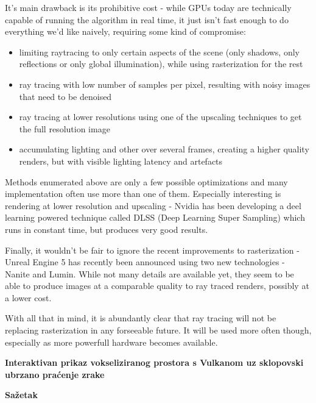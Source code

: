 \documentclass[times, utf8, zavrsni]{fer}
\begin{document}
It's main drawback is its prohibitive cost - while GPUs today are technically capable of running the algorithm in real time, it just isn't fast enough to do everything we'd like naively, requiring some kind of compromise:
\begin{itemize}
	\item limiting raytracing to only certain aspects of the scene (only shadows, only reflections or only global illumination), while using rasterization for the rest
	\item ray tracing with low number of samples per pixel, resulting with noisy images that need to be denoised
	\item ray tracing at lower resolutions using one of the upscaling techniques to get the full resolution image
	\item accumulating lighting and other over several frames, creating a higher quality renders, but with visible lighting latency and artefacts
\end{itemize}

Methods enumerated above are only a few possible optimizations and many implementation often use more than one of them. Especially interesting is rendering at lower resolution and upscaling - Nvidia has been developing a deel learning powered technique called DLSS (Deep Learning Super Sampling) which runs in constant time, but produces very good results.

Finally, it wouldn't be fair to ignore the recent improvements to rasterization - Unreal Engine 5 has recently been announced using two new technologies - Nanite and Lumin. While not many details are available yet, they seem to be able to produce images at a comparable quality to ray traced renders, possibly at a lower cost.

With all that in mind, it is abundantly clear that ray tracing will not be replacing rasterization in any forseeable future. It will be used more often though, especially as more powerfull hardware becomes available.




\newpage
\vspace*{\fill}
\thispagestyle{empty}
\begin{center}
	{\bf Interaktivan prikaz vokseliziranog prostora s Vulkanom uz sklopovski ubrzano praćenje zrake}
\end{center}
\hspace*{\fill} {\bf Sa\v{z}etak} \hspace*{\fill} \par
\vspace*{25pt}
\end{document}
